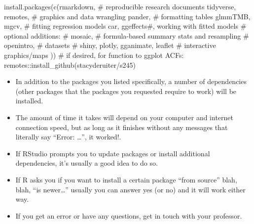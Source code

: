 \documentclass[
  letterpaper,
  DIV=11,
  numbers=noendperiod]{scrreprt}
\newenvironment{Shaded}{\begin{snugshade}}{\end{snugshade}}
\newcommand{\CommentTok}[1]{\textcolor[rgb]{0.37,0.37,0.37}{#1}}
\newcommand{\FunctionTok}[1]{\textcolor[rgb]{0.28,0.35,0.67}{#1}}
\newcommand{\NormalTok}[1]{\textcolor[rgb]{0.00,0.23,0.31}{#1}}
\newcommand{\SpecialCharTok}[1]{\textcolor[rgb]{0.37,0.37,0.37}{#1}}
\newcommand{\StringTok}[1]{\textcolor[rgb]{0.13,0.47,0.30}{#1}}
\providecommand{\tightlist}{%
  \setlength{\itemsep}{0pt}\setlength{\parskip}{0pt}}\usepackage{longtable,booktabs,array}
\theoremstyle{remark}
\begin{document}
\begin{Shaded}
\begin{Highlighting}[]
\FunctionTok{install.packages}\NormalTok{(}\FunctionTok{c}\NormalTok{(}\StringTok{\textquotesingle{}rmarkdown\textquotesingle{}}\NormalTok{, }\CommentTok{\# reproducible research documents}
                   \StringTok{\textquotesingle{}tidyverse\textquotesingle{}}\NormalTok{, }\StringTok{\textquotesingle{}remotes\textquotesingle{}}\NormalTok{, }\CommentTok{\# graphics and data wrangling}
                   \StringTok{\textquotesingle{}pander\textquotesingle{}}\NormalTok{, }\CommentTok{\# formatting tables}
                   \StringTok{\textquotesingle{}glmmTMB\textquotesingle{}}\NormalTok{, }\StringTok{\textquotesingle{}mgcv\textquotesingle{}}\NormalTok{, }\CommentTok{\# fitting regression models}
                   \StringTok{\textquotesingle{}car\textquotesingle{}}\NormalTok{, }\StringTok{\textquotesingle{}ggeffects\textquotesingle{}}\CommentTok{\#,  working with fitted models}
                   \CommentTok{\# optional additions:}
                   \CommentTok{\# \textquotesingle{}mosaic\textquotesingle{}, \# formula{-}based summary stats and resampling}
                   \CommentTok{\# \textquotesingle{}openintro\textquotesingle{}, \# datasets}
                   \CommentTok{\# \textquotesingle{}shiny\textquotesingle{}, \textquotesingle{}plotly\textquotesingle{}, \textquotesingle{}gganimate\textquotesingle{}, \textquotesingle{}leaflet\textquotesingle{} \# interactive graphics/maps}
\NormalTok{                   )) }
\CommentTok{\# if desired, for function to ggplot ACFs:}
\NormalTok{remotes}\SpecialCharTok{::}\FunctionTok{install\_github}\NormalTok{(}\StringTok{\textquotesingle{}stacyderuiter/s245\textquotesingle{}}\NormalTok{)}
\end{Highlighting}
\end{Shaded}

\begin{itemize}
\tightlist
\item
  In addition to the packages you listed specifically, a number of
  dependencies (other packages that the packages you requested require
  to work) will be installed.
\item
  The amount of time it takes will depend on your computer and internet
  connection speed, but as long as it finishes without any messages that
  literally say ``Error: \ldots{}'', it worked!.
\item
  If RStudio prompts you to update packages or install additional
  dependencies, it's usually a good idea to do so.
\item
  If R asks you if you want to install a certain package ``from source''
  blah, blah, ``is newer\ldots{}'' usually you can answer yes (or no)
  and it will work either way.
\item
  If you get an error or have any questions, get in touch with your
  professor.
\end{itemize}
\end{document}
